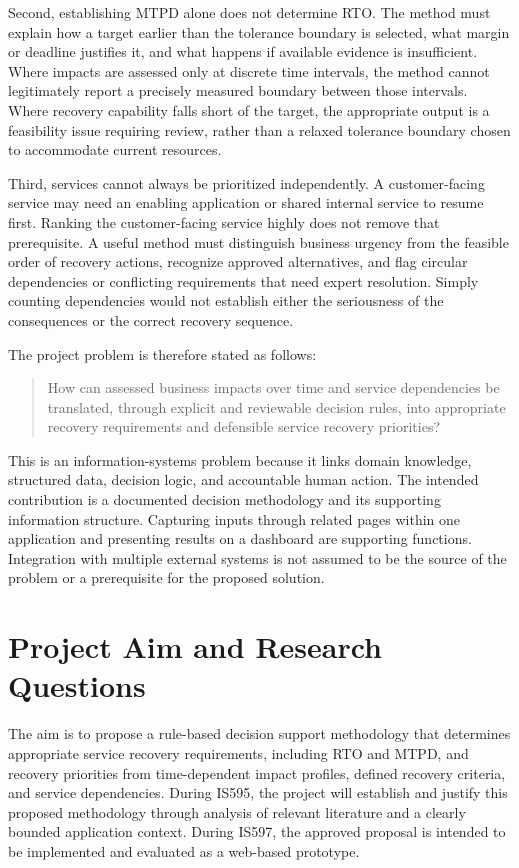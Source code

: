Second, establishing MTPD alone does not determine RTO. The method must explain how a target earlier than the tolerance boundary is selected, what margin or deadline justifies it, and what happens if available evidence is insufficient. Where impacts are assessed only at discrete time intervals, the method cannot legitimately report a precisely measured boundary between those intervals. Where recovery capability falls short of the target, the appropriate output is a feasibility issue requiring review, rather than a relaxed tolerance boundary chosen to accommodate current resources.

Third, services cannot always be prioritized independently. A customer-facing service may need an enabling application or shared internal service to resume first. Ranking the customer-facing service highly does not remove that prerequisite. A useful method must distinguish business urgency from the feasible order of recovery actions, recognize approved alternatives, and flag circular dependencies or conflicting requirements that need expert resolution. Simply counting dependencies would not establish either the seriousness of the consequences or the correct recovery sequence.

The project problem is therefore stated as follows:
\begin{quote}
How can assessed business impacts over time and service dependencies be translated, through explicit and reviewable decision rules, into appropriate recovery requirements and defensible service recovery priorities?
\end{quote}

This is an information-systems problem because it links domain knowledge, structured data, decision logic, and accountable human action. The intended contribution is a documented decision methodology and its supporting information structure. Capturing inputs through related pages within one application and presenting results on a dashboard are supporting functions. Integration with multiple external systems is not assumed to be the source of the problem or a prerequisite for the proposed solution.

\section{Project Aim and Research Questions}
\label{sec:intro-questions}

The aim is to propose a rule-based decision support methodology that determines appropriate service recovery requirements, including RTO and MTPD, and recovery priorities from time-dependent impact profiles, defined recovery criteria, and service dependencies. During IS595, the project will establish and justify this proposed methodology through analysis of relevant literature and a clearly bounded application context. During IS597, the approved proposal is intended to be implemented and evaluated as a web-based prototype.

